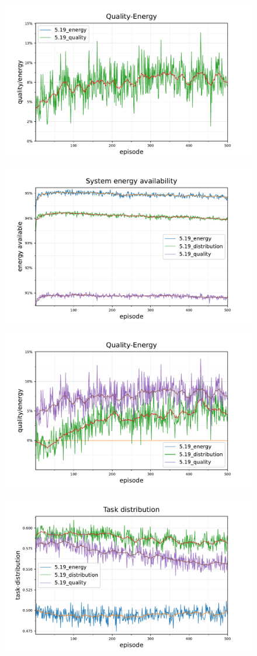 \begin{figure}
	\centering
	\includegraphics[width=0.7\linewidth]{5.19a_ctv-quality-energy-baseline-comparison}
	\caption{}
	\label{fig:5}
\end{figure}
\begin{figure}
	\centering
	\includegraphics[width=0.7\linewidth]{5.19_ctv-statistics-energy-available-comparison}
	\caption{}
	\label{fig:5}
\end{figure}
\begin{figure}
	\centering
	\includegraphics[width=0.7\linewidth]{5.19_ctv-quality-energy-baseline-comparison}
	\caption{}
	\label{fig:5}
\end{figure}
\begin{figure}
	\centering
	\includegraphics[width=0.7\linewidth]{5.19_ctv-task-distribution-comparison}
	\caption{}
	\label{fig:5}
\end{figure}
